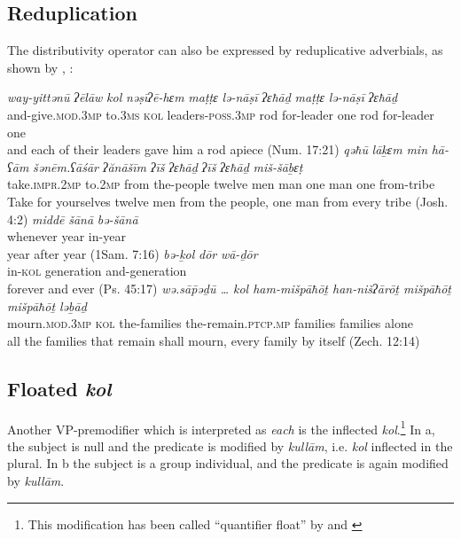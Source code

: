 \documentclass[output=paper]{langsci/langscibook}
\begin{document}
\subsection{Reduplication}%
The distributivity operator can also be expressed by reduplicative adverbials, as shown by \citet{BeckStechow2006}, \citet{NaudeMillerNaude2015}:

\ea%
    \label{ex:doron:48}
    \ea
    \gll \textit{way-yittənū}             \textit{ʔēlāw}   \textit{kol}  \textit{nəṣīʔē-hɛm}           \textit{maṭṭɛ} \textit{lə-nāṣī}      \textit{ʔɛħāḏ} \textit{maṭṭɛ} \textit{lə-nāṣī}    \textit{ʔɛħāḏ}\\
         and-give.\textsc{mod.3mp}  to.\textsc{3ms}  \textsc{kol} leaders-\textsc{poss.3mp} rod  for-leader one    rod   for-leader one\\
    \glt and each of their leaders gave him a rod apiece (Num. 17:21)
    \ex
    \gll \textit{qəħū}                  \textit{lāḵɛm}  \textit{min}   \textit{hā-ʕām}      \textit{šənēm.ʕāśār} \textit{ʔănāšīm} \textit{ʔīš}    \textit{ʔɛħāḏ}  \textit{ʔīš}    \textit{ʔɛħāḏ}  \textit{miš-šāḇɛṭ}\\
         take.\textsc{impr.2mp}  to.2\textsc{mp} from the-people twelve           men       man one      man one    from-tribe\\
    \glt Take for yourselves twelve men from the people, one man from every tribe (Josh. 4:2)
    \ex
    \gll \textit{middē}       \textit{šānā}  \textit{bə-šānā}\\
         whenever year  in-year \\
    \glt year after year (1Sam. 7:16)
    \ex
    \gll \textit{bə-ḵol}  \textit{dōr}             \textit{wā-ḏōr}\\
         in-\textsc{kol} generation and-generation     \\
    \glt forever and ever  (Ps. 45:17)
    \ex
    \gll \textit{wə.sā\={p}əḏū …       kol  ham-mišpāħōṯ  han-nišʔārōṯ             mišpāħōṯ mišpāħōṯ ləḇāḏ}\\
         mourn.\textsc{mod.3mp}  \textsc{kol} the-families     the-remain.\textsc{ptcp.mp}  families families   alone   \\
    \glt all the families that remain shall mourn, every family by itself (Zech. 12:14)
    \z
\z

\subsection{Floated \textit{kol}}%
Another VP-premodifier which is interpreted as \textit{each} is the inflected \textit{kol}.\footnote{This modification has been called “quantifier float” by \citet{Shlonsky1991} and \cite{Naudé2011interpretation}} In a, the subject is null and the predicate is modified by \textit{kullām}, i.e. \textit{kol} inflected in the plural. In b the subject is a group individual, and the predicate is again modified by \textit{kullām}.
\end{document}
